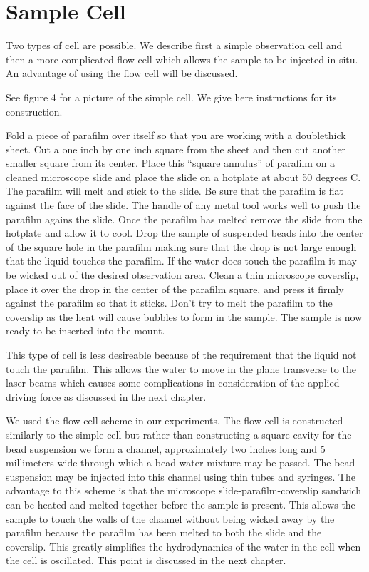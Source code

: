 \documentclass{report}
\begin{document}
\section{Sample Cell}

Two types of cell are possible. We describe first a simple observation cell and then a more complicated flow cell which allows the sample to be injected in situ. An advantage of using the flow cell will be discussed.

See figure 4 for a picture of the simple cell. We give here instructions for its construction.

Fold a piece of parafilm over itself so that you are working with a doublethick sheet. Cut a one inch by one inch square from the sheet and then cut another smaller square from its center. Place this ``square annulus'' of parafilm on a cleaned microscope slide and place the slide on a hotplate at about 50 degrees C. The parafilm will melt and stick to the slide. Be sure that the parafilm is flat against the face of the slide. The handle of any metal tool works well to push the parafilm agains the slide. Once the parafilm has melted remove the slide from the hotplate and allow it to cool. Drop the sample of suspended beads into the center of the square hole in the parafilm making sure that the drop is not large enough that the liquid touches the parafilm. If the water does touch the parafilm it may be wicked out of the desired observation area. Clean a thin microscope coverslip, place it over the drop in the center of the parafilm square, and press it firmly against the parafilm so that it sticks. Don't try to melt the parafilm to the coverslip as the heat will cause bubbles to form in the sample. The sample is now ready to be inserted into the mount.

This type of cell is less desireable because of the requirement that the liquid not touch the parafilm. This allows the water to move in the plane transverse to the laser beams which causes some complications in consideration of the applied driving force as discussed in the next chapter.

We used the flow cell scheme in our experiments. The flow cell is constructed similarly to the simple cell but rather than constructing a square cavity for the bead suspension we form a channel, approximately two inches long and 5 millimeters wide through which a bead-water mixture may be passed. The bead suspension may be injected into this channel using thin tubes and syringes. The advantage to this scheme is that the microscope slide-parafilm-coverslip sandwich can be heated and melted together before the sample is present. This allows the sample to touch the walls of the channel without being wicked away by the parafilm because the parafilm has been melted to both the slide and the coverslip. This greatly simplifies the hydrodynamics of the water in the cell when the cell is oscillated. This point is discussed in the next chapter.
\end{document}
